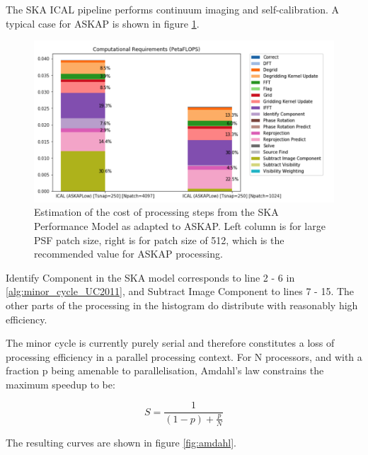 \documentclass[11pt,a4paper,variablewidth]{article}
\begin{document}
The SKA ICAL pipeline performs continuum imaging and self-calibration. A typical case for ASKAP is shown in figure \ref{fig:processing_histogram}. 

\begin{figure}[htb]
  \centering
  \includegraphics[width=\textwidth]{./processing_histogram.png}
  \caption{Estimation of the cost of processing steps from the SKA Performance Model as adapted to ASKAP. Left column is for large PSF patch size, right is for patch size of 512, which is the recommended value for ASKAP processing.}
  \label{fig:processing_histogram}
\end{figure}

Identify Component in the SKA model corresponds to line 2 - 6 in \ref{alg:minor_cycle_UC2011}, and Subtract Image Component to lines 7 - 15. The other parts of the processing in the histogram do distribute with reasonably high efficiency. 

The minor cycle is currently purely serial and therefore constitutes a loss of processing efficiency in a parallel processing context. For N processors, and with a fraction p being amenable to parallelisation, Amdahl's law constrains the maximum speedup to be:

\begin{equation}
S = \frac{1}{(1-p) + \frac{p}{N}}
\end{equation}

The resulting curves are shown in figure \ref{fig:amdahl}. 
\end{document}
